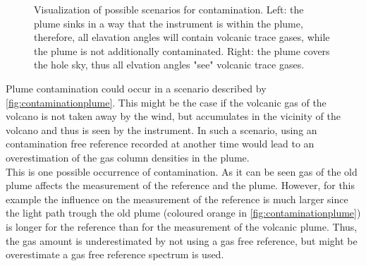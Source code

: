 \begin{figure}
	\centering
	\caption{Visualization of possible scenarios for contamination. Left: the plume sinks in a way that the instrument is within the plume, therefore, all elavation angles will contain volcanic trace gases, while the plume is not additionally contaminated. Right: the plume covers the hole sky, thus all elvation angles "see" volcanic trace gases. }
	\label{fig:contaminationplumewideplume}
\end{figure}
%
Plume contamination could occur in a scenario described by  \cref{fig:contaminationplume}.
This might be the case if the volcanic gas of the volcano is not taken away by the wind, but accumulates in the vicinity of the volcano and thus is seen by the instrument. In such a scenario, using an contamination free reference recorded at another time would lead to an overestimation of the gas column densities in the plume.\\
This is one possible occurrence of contamination. As it can be seen gas of the old plume affects the measurement of the reference and the plume. However, for this example the influence on the measurement of the reference is much larger since the light path trough the old plume (coloured orange in \cref{fig:contaminationplume}) is longer for the reference than for the measurement of the volcanic plume. Thus, the gas amount is underestimated by not using a gas free reference, but might be overestimate a gas free reference spectrum is used.
